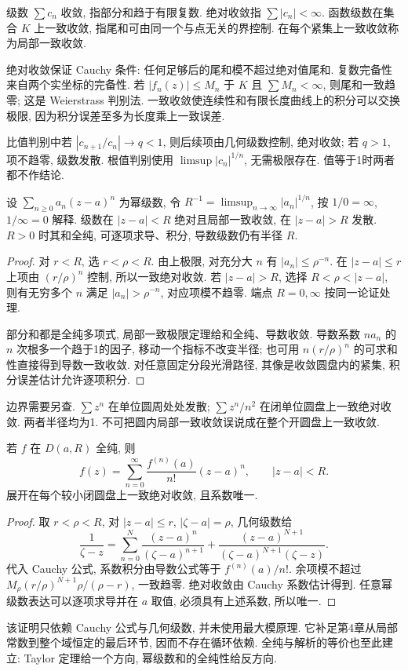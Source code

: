 \begin{definition}
级数 $\sum c_n$ 收敛, 指部分和趋于有限复数. 绝对收敛指 $\sum|c_n|<\infty$. 函数级数在集合 $K$ 上一致收敛, 指尾和可由同一个与点无关的界控制. 在每个紧集上一致收敛称为局部一致收敛.
\end{definition}
绝对收敛保证 Cauchy 条件: 任何足够后的尾和模不超过绝对值尾和. 复数完备性来自两个实坐标的完备性. 若 $|f_n(z)|\le M_n$ 于 $K$ 且 $\sum M_n<\infty$, 则尾和一致趋零; 这是 Weierstrass 判别法. 一致收敛使连续性和有限长度曲线上的积分可以交换极限, 因为积分误差至多为长度乘上一致误差.

比值判别中若 $|c_{n+1}/c_n|\to q<1$, 则后续项由几何级数控制, 绝对收敛; 若 $q>1$, 项不趋零, 级数发散. 根值判别使用 $\limsup |c_n|^{1/n}$, 无需极限存在. 值等于1时两者都不作结论.
\begin{theorem}[收敛半径]\label{thm:radius}
设 $\sum_{n\ge0}a_n(z-a)^n$ 为幂级数, 令 $R^{-1}=\limsup_{n\to\infty}|a_n|^{1/n}$, 按 $1/0=\infty$, $1/\infty=0$ 解释. 级数在 $|z-a|<R$ 绝对且局部一致收敛, 在 $|z-a|>R$ 发散. $R>0$ 时其和全纯, 可逐项求导、积分, 导数级数仍有半径 $R$.
\end{theorem}
\begin{proof}
对 $r<R$, 选 $r<\rho<R$. 由上极限, 对充分大 $n$ 有 $|a_n|\le \rho^{-n}$. 在 $|z-a|\le r$ 上项由 $(r/\rho)^n$ 控制, 所以一致绝对收敛. 若 $|z-a|>R$, 选择 $R<\rho<|z-a|$, 则有无穷多个 $n$ 满足 $|a_n|>\rho^{-n}$, 对应项模不趋零. 端点 $R=0,\infty$ 按同一论证处理.

部分和都是全纯多项式, 局部一致极限定理给和全纯、导数收敛. 导数系数 $na_n$ 的 $n$ 次根多一个趋于1的因子, 移动一个指标不改变半径; 也可用 $n(r/\rho)^n$ 的可求和性直接得到导数一致收敛. 对任意固定分段光滑路径, 其像是收敛圆盘内的紧集, 积分误差估计允许逐项积分.
\end{proof}
边界需要另查. $\sum z^n$ 在单位圆周处处发散; $\sum z^n/n^2$ 在闭单位圆盘上一致绝对收敛. 两者半径均为1. 不可把圆内局部一致收敛误说成在整个开圆盘上一致收敛.

\begin{theorem}\label{thm:taylor}
若 $f$ 在 $D(a,R)$ 全纯, 则
\[
f(z)=\sum_{n=0}^\infty\frac{f^{(n)}(a)}{n!}(z-a)^n,\qquad |z-a|<R.
\]
展开在每个较小闭圆盘上一致绝对收敛, 且系数唯一.
\end{theorem}
\begin{proof}
取 $r<\rho<R$, 对 $|z-a|\le r$, $|\zeta-a|=\rho$, 几何级数给
\[
\frac1{\zeta-z}=\sum_{n=0}^N\frac{(z-a)^n}{(\zeta-a)^{n+1}}
 +\frac{(z-a)^{N+1}}{(\zeta-a)^{N+1}(\zeta-z)}.
\]
代入 Cauchy 公式, 系数积分由导数公式等于 $f^{(n)}(a)/n!$. 余项模不超过 $M_\rho(r/\rho)^{N+1}\rho/(\rho-r)$, 一致趋零. 绝对收敛由 Cauchy 系数估计得到. 任意幂级数表达可以逐项求导并在 $a$ 取值, 必须具有上述系数, 所以唯一.
\end{proof}
该证明只依赖 Cauchy 公式与几何级数, 并未使用最大模原理. 它补足第4章从局部常数到整个域恒定的最后环节, 因而不存在循环依赖. 全纯与解析的等价也至此建立: Taylor 定理给一个方向, 幂级数和的全纯性给反方向.

